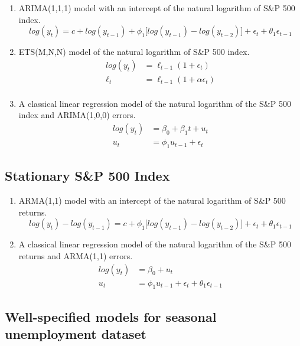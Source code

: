 \documentclass{monashthesis}
\begin{document}
\begin{enumerate}
\def\labelenumi{\arabic{enumi}.}
\item
  ARIMA(1,1,1) model with an intercept of the natural logarithm of S\&P 500 index.
  \begin{equation*}
  log(y_t) = c + log(y_{t-1}) + \phi_1\big[log(y_{t-1})-log(y_{t-2})\big] + \epsilon_t + \theta_1\epsilon_{t-1}
  \end{equation*}
\item
  ETS(M,N,N) model of the natural logarithm of S\&P 500 index.
  \begin{align*}
  log(y_t) &= \ell_{t-1} (1+\epsilon_t) \\
  \ell_t &= \ell_{t-1} (1+\alpha \epsilon_t) \\
  \end{align*}
\item
  A classical linear regression model of the natural logarithm of the S\&P 500 index and ARIMA(1,0,0) errors.
  \begin{align*}
  log(y_t) &= \beta_0 + \beta_1 t + u_t \\
  u_t &= \phi_1 u_{t-1} + \epsilon_t
  \end{align*}
\end{enumerate}

\hypertarget{stationary-sp-500-index}{%
\subsection{Stationary S\&P 500 Index}\label{stationary-sp-500-index}}

\begin{enumerate}
\def\labelenumi{\arabic{enumi}.}
\item
  ARMA(1,1) model with an intercept of the natural logarithm of S\&P 500 returns.
  \begin{equation*}
  log(y_t) - log(y_{t-1}) = c + \phi_1\big[log(y_{t-1})-log(y_{t-2})\big] + \epsilon_t + \theta_1\epsilon_{t-1}
  \end{equation*}
\item
  A classical linear regression model of the natural logarithm of the S\&P 500 returns and ARMA(1,1) errors.
  \begin{align*}
  log(y_t) &= \beta_0 + u_t \\
  u_t &= \phi_1 u_{t-1} + \epsilon_t + \theta_1\epsilon_{t-1}
  \end{align*}
\end{enumerate}

\hypertarget{well-specified-models-for-seasonal-unemployment-dataset}{%
\subsection{Well-specified models for seasonal unemployment dataset}\label{well-specified-models-for-seasonal-unemployment-dataset}}
\end{document}
